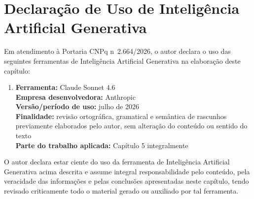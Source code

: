 \section{Declaração de Uso de Inteligência Artificial Generativa}

Em atendimento à Portaria CNPq n\textordmasculine\ 2.664/2026, o autor declara o uso das seguintes ferramentas de Inteligência Artificial Generativa na elaboração deste capítulo:

\begin{enumerate}
    \item \textbf{Ferramenta:} Claude Sonnet 4.6 \\
    \textbf{Empresa desenvolvedora:} Anthropic \\
    \textbf{Versão/período de uso:} julho de 2026 \\
    \textbf{Finalidade:} revisão ortográfica, gramatical e semântica de rascunhos previamente elaborados pelo autor, sem alteração do conteúdo ou sentido do texto \\
    \textbf{Parte do trabalho aplicada:} Capítulo 5 integralmente
\end{enumerate}

O autor declara estar ciente do uso da ferramenta de Inteligência Artificial Generativa acima descrita e assume integral responsabilidade pelo conteúdo, pela veracidade das informações e pelas conclusões apresentadas neste capítulo, tendo revisado criticamente todo o material gerado ou auxiliado por tal ferramenta.
